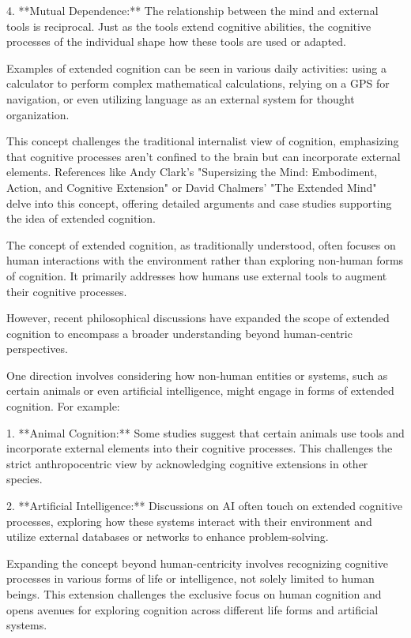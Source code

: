 \documentclass[10pt,titlepage]{book}
\begin{document}
4. **Mutual Dependence:** The relationship between the mind and external tools is reciprocal. Just as the tools extend cognitive abilities, the cognitive processes of the individual shape how these tools are used or adapted.

Examples of extended cognition can be seen in various daily activities: using a calculator to perform complex mathematical calculations, relying on a GPS for navigation, or even utilizing language as an external system for thought organization.

This concept challenges the traditional internalist view of cognition, emphasizing that cognitive processes aren't confined to the brain but can incorporate external elements. References like Andy Clark's "Supersizing the Mind: Embodiment, Action, and Cognitive Extension" or David Chalmers' "The Extended Mind" delve into this concept, offering detailed arguments and case studies supporting the idea of extended cognition.

The concept of extended cognition, as traditionally understood, often focuses on human interactions with the environment rather than exploring non-human forms of cognition. It primarily addresses how humans use external tools to augment their cognitive processes.

However, recent philosophical discussions have expanded the scope of extended cognition to encompass a broader understanding beyond human-centric perspectives. 

One direction involves considering how non-human entities or systems, such as certain animals or even artificial intelligence, might engage in forms of extended cognition. For example:

1. **Animal Cognition:** Some studies suggest that certain animals use tools and incorporate external elements into their cognitive processes. This challenges the strict anthropocentric view by acknowledging cognitive extensions in other species.

2. **Artificial Intelligence:** Discussions on AI often touch on extended cognitive processes, exploring how these systems interact with their environment and utilize external databases or networks to enhance problem-solving.

Expanding the concept beyond human-centricity involves recognizing cognitive processes in various forms of life or intelligence, not solely limited to human beings. This extension challenges the exclusive focus on human cognition and opens avenues for exploring cognition across different life forms and artificial systems.
\end{document}
